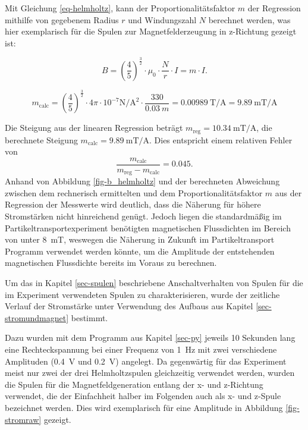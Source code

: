 \documentclass[page,pdftex,12pt,a4paper,twoside,openright]{scrbook}
\begin{document}
Mit Gleichung \ref{eq-helmholtz}, kann der Proportionalitätsfaktor \(m\) der Regression mithilfe von gegebenem Radius \(r\) und Windungszahl \(N\) berechnet werden, was hier exemplarisch für die Spulen zur Magnetfelderzeugung in z-Richtung gezeigt ist:

\begin{equation}
B = \left(\frac{4}{5}\right)^{\frac{3}{2}} \cdot \mu_{\mathrm{0}} \cdot \frac{N}{r} \cdot I = m \cdot I.
\end{equation}

\begin{equation}
\label{eq-regression}
m_\mathrm{calc} = \left(\frac{4}{5}\right)^{\frac{3}{2}} \cdot 4\pi \cdot 10^{-7}\si{\newton\per\square\ampere} \cdot \frac{330}{\SI{0.03}{m}} = \SI{0.00989}{\tesla\per\ampere} = \SI{9.89}{\milli\tesla\per\ampere}
\end{equation}

Die Steigung aus der linearen Regression beträgt \(m_\mathrm{reg} = \SI{10.34}{\milli\tesla\per\ampere}\), die berechnete Steigung \(m_\mathrm{calc} = \SI{9.89}{\milli\tesla\per\ampere}\). Dies entspricht einem relativen Fehler von $$ \frac{m_\mathrm{calc}}{m_\mathrm{reg} -m_\mathrm{calc}} = 0.045 .$$
Anhand von Abbildung \ref{fig-b_helmholtz} und der berechneten Abweichung zwischen dem rechnerisch ermittelten und dem Proportionalitätsfaktor \(m\) aus der Regression der Messwerte wird deutlich, dass die Näherung für höhere Stromstärken nicht hinreichend genügt. Jedoch liegen die standardmäßig im Partikeltransportexperiment benötigten magnetischen Flussdichten im Bereich von unter \SI{8}{\milli\tesla}, weswegen die Näherung in Zukunft im Partikeltransport Programm verwendet werden könnte, um die Amplitude der entstehenden magnetischen Flussdichte bereits im Voraus zu berechnen.

Um das in Kapitel \ref{sec-spulen} beschriebene Anschaltverhalten von Spulen für die im Experiment verwendeten Spulen zu charakterisieren, wurde der zeitliche Verlauf der Stromstärke unter Verwendung des Aufbaus aus Kapitel \ref{sec-stromundmagnet} bestimmt.

Dazu wurden mit dem Programm aus Kapitel \ref{sec-py} jeweils 10 Sekunden lang eine Rechteckspannung bei einer Frequenz von \SI{1}{\hertz} mit zwei verschiedene Amplituden (\SI{0.4}{\volt} und \SI{0.2}{\volt}) angelegt. Da gegenwärtig für das Experiment meist nur zwei der drei Helmholtzspulen gleichzeitig verwendet werden, wurden die Spulen für die Magnetfeldgeneration entlang der x- und z-Richtung verwendet, die der Einfachheit halber im Folgenden auch als x- und z-Spule bezeichnet werden. Dies wird exemplarisch für eine Amplitude in Abbildung \ref{fig-stromraw} gezeigt.
\end{document}
